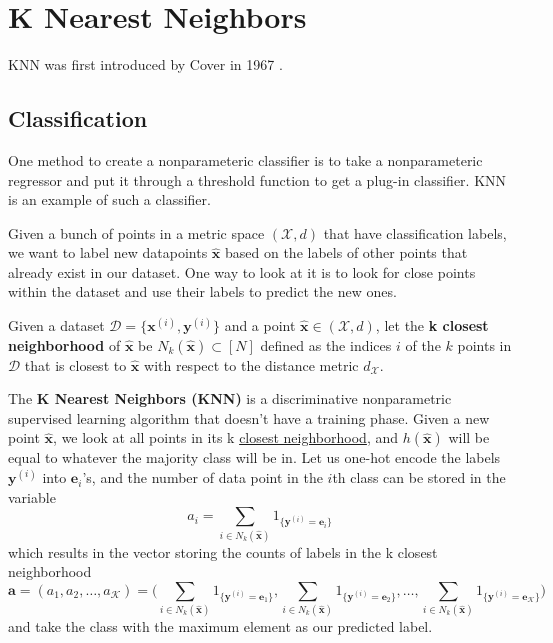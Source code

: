 \section{K Nearest Neighbors} 

  KNN was first introduced by Cover in 1967 \cite{1967cover}. 

\subsection{Classification} 

  One method to create a nonparameteric classifier is to take a nonparameteric regressor and put it through a threshold function to get a plug-in classifier. KNN is an example of such a classifier. 

  Given a bunch of points in a metric space $(\mathcal{X}, d)$ that have classification labels, we want to label new datapoints $\hat{\mathbf{x}}$ based on the labels of other points that already exist in our dataset. One way to look at it is to look for close points within the dataset and use their labels to predict the new ones. 

  \begin{definition}
    \label{def:closest-neighborhood}
    Given a dataset $\mathcal{D} = \{\mathbf{x}^{(i)}, \mathbf{y}^{(i)}\}$ and a point $\hat{\mathbf{x}} \in (\mathcal{X}, d)$, let the \textbf{k closest neighborhood} of $\hat{\mathbf{x}}$ be $N_k (\hat{\mathbf{x}}) \subset [N]$ defined as the indices $i$ of the $k$ points in $\mathcal{D}$ that is closest to $\hat{\mathbf{x}}$ with respect to the distance metric $d_\mathcal{X}$. 
  \end{definition}

  \begin{definition}
    \label{def:k-nearest-neighbors}
    The \textbf{K Nearest Neighbors (KNN)} is a discriminative nonparametric supervised learning algorithm that doesn't have a training phase. Given a new point $\hat{\mathbf{x}}$, we look at all points in its k \hyperref[def:closest-neighborhood]{closest neighborhood}, and $h(\hat{\mathbf{x}})$ will be equal to whatever the majority class will be in. Let us one-hot encode the labels $\mathbf{y}^{(i)}$ into $\mathbf{e}_i$'s, and the number of data point in the $i$th class can be stored in the variable 
    \begin{equation}
      a_i = \sum_{i \in N_k (\hat{\mathbf{x}})} 1_{\{\mathbf{y}^{(i)} = \mathbf{e}_i\}}
    \end{equation}
    which results in the vector storing the counts of labels in the k closest neighborhood 
    \begin{equation}
      \mathbf{a} = (a_1, a_2, \ldots, a_\mathcal{K}) = \bigg( \sum_{i \in N_k (\hat{\mathbf{x}})} 1_{\{\mathbf{y}^{(i)} = \mathbf{e}_1\}}, \sum_{i \in N_k (\hat{\mathbf{x}})} 1_{\{\mathbf{y}^{(i)} = \mathbf{e}_2\}}, \ldots, \sum_{i \in N_k (\hat{\mathbf{x}})} 1_{\{\mathbf{y}^{(i)} = \mathbf{e}_\mathcal{K}\}} \bigg) 
    \end{equation}
    and take the class with the maximum element as our predicted label. 
  \end{definition}

